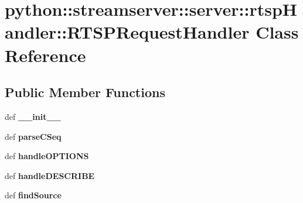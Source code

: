 \hypertarget{classpython_1_1streamserver_1_1server_1_1rtspHandler_1_1RTSPRequestHandler}{
\section{python::streamserver::server::rtspHandler::RTSPRequestHandler Class Reference}
\label{classpython_1_1streamserver_1_1server_1_1rtspHandler_1_1RTSPRequestHandler}
}
\subsection*{Public Member Functions}
\begin{DoxyCompactItemize}
\item 
\hypertarget{classpython_1_1streamserver_1_1server_1_1rtspHandler_1_1RTSPRequestHandler_a32a8f95264daf589e178bdf421d681e9}{
def {\bfseries \_\-\_\-init\_\-\_\-}}
\label{classpython_1_1streamserver_1_1server_1_1rtspHandler_1_1RTSPRequestHandler_a32a8f95264daf589e178bdf421d681e9}

\item 
\hypertarget{classpython_1_1streamserver_1_1server_1_1rtspHandler_1_1RTSPRequestHandler_aaa78bcfabbe0df852f1f6ad0003de2c6}{
def {\bfseries parseCSeq}}
\label{classpython_1_1streamserver_1_1server_1_1rtspHandler_1_1RTSPRequestHandler_aaa78bcfabbe0df852f1f6ad0003de2c6}

\item 
\hypertarget{classpython_1_1streamserver_1_1server_1_1rtspHandler_1_1RTSPRequestHandler_adc3c9ce4aea84c327ac493cb8a0ee2b0}{
def {\bfseries handleOPTIONS}}
\label{classpython_1_1streamserver_1_1server_1_1rtspHandler_1_1RTSPRequestHandler_adc3c9ce4aea84c327ac493cb8a0ee2b0}

\item 
\hypertarget{classpython_1_1streamserver_1_1server_1_1rtspHandler_1_1RTSPRequestHandler_a5eb6ba4ed5ec8c8c80d192ae0808c1b6}{
def {\bfseries handleDESCRIBE}}
\label{classpython_1_1streamserver_1_1server_1_1rtspHandler_1_1RTSPRequestHandler_a5eb6ba4ed5ec8c8c80d192ae0808c1b6}

\item 
\hypertarget{classpython_1_1streamserver_1_1server_1_1rtspHandler_1_1RTSPRequestHandler_a487523a7e2efa0b81f9415ddf0dba843}{
def {\bfseries findSource}}
\label{classpython_1_1streamserver_1_1server_1_1rtspHandler_1_1RTSPRequestHandler_a487523a7e2efa0b81f9415ddf0dba843}

\end{DoxyCompactItemize}
